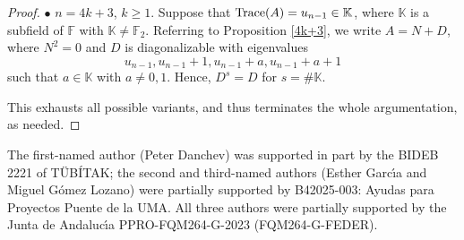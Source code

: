 \documentclass{amsart}
\def\FF{\mathbb{F}}
\def\KK{\mathbb{K}}
\theoremstyle{definition}
\theoremstyle{remark}
\numberwithin{equation}{section}
\begin{document}
\begin{proof}
\medskip

$\bullet$ $n=4k+3$, $k\ge 1$. Suppose that ${\rm Trace}(A)=u_{n-1}\in \KK$, where $\KK$ is a subfield of $\FF$ with $\KK\ne \FF_2$. Referring to Proposition \ref{4k+3}, we write $A=N+D$, where $N^2=0$ and $D$ is diagonalizable with eigenvalues $$u_{n-1}, u_{n-1}+1, u_{n-1}+a, u_{n-1}+a+1$$ such that $a\in \KK$ with $a\ne 0,1$. Hence, $D^s=D$ for $s=\#\KK$.

\medskip

This exhausts all possible variants, and thus terminates the whole argumentation, as needed.
\end{proof}

\bigskip
\bigskip
\bigskip

 The first-named author (Peter Danchev) was supported in part by the BIDEB 2221 of T\"UB\'ITAK; the second and third-named authors (Esther Garc\'{\i}a and Miguel G\'omez Lozano) were partially supported by B42025-003: Ayudas para Proyectos Puente de la UMA. All three authors were partially supported by the Junta de Andaluc\'{\i}a PPRO-FQM264-G-2023 (FQM264-G-FEDER).

\vskip3.0pc


\end{document}
